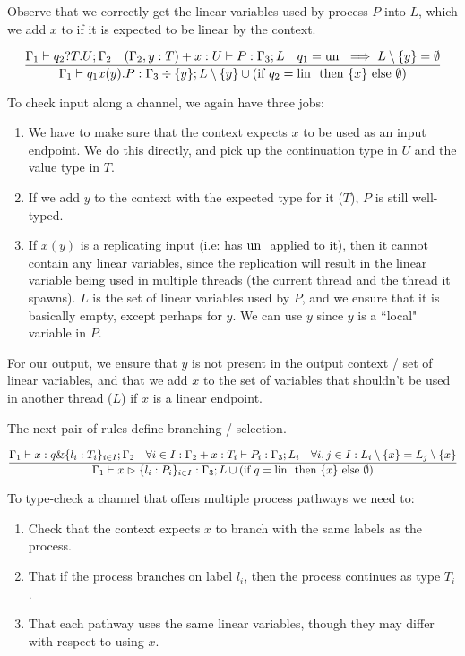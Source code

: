 Observe that we correctly get the linear variables used by process $P$ into $L$, which we add $x$ to if it is expected to be linear by the context.

$$
\frac{\Gamma_1 \vdash q_2?T.U ; \Gamma_2 \quad (\Gamma_2, y : T) + x : U \vdash P : \Gamma_3 ; L \quad q_1 = \text{un } \implies L \setminus \{y\} = \emptyset}{\Gamma_1 \vdash q_1 x(y) . P : \Gamma_3 \div \{y\} ; L \setminus \{y\} \cup  (\text{if } q_2 = \text{lin } \text{ then } \{x\} \text{ else } \emptyset)}
$$

To check input along a channel, we again have three jobs:
\begin{enumerate}
    \item We have to make sure that the context expects $x$ to be used as an input endpoint. We do this directly, and pick up the continuation type in $U$ and the value type in $T$.
    \item If we add $y$ to the context with the expected type for it ($T$), $P$ is still well-typed. 
    \item If $x(y)$ is a replicating input (i.e: has $\text{un }$ applied to it), then it cannot contain any linear variables, since the replication will result in the linear variable being used in multiple threads (the current thread and the thread it spawns). $L$ is the set of linear variables used by $P$, and we ensure that it is basically empty, except perhaps for $y$. We can use $y$ since $y$ is a ``local" variable in $P$.
\end{enumerate}

For our output, we ensure that $y$ is not present in the output context / set of linear variables, and that we add $x$ to the set of variables that shouldn't be used in another thread ($L$) if $x$ is a linear endpoint.


The next pair of rules define branching / selection.

$$
\frac{\Gamma_1 \vdash x : q \& \{l_i : T_i\}_{i \in I} ; \Gamma_2 \quad \forall{i \in I}:\Gamma_2 + x : T_i \vdash P_i : \Gamma_3 ; L_i \quad \forall{i,j \in I} : L_i \setminus \{x\} = L_j \setminus \{x\}}{\Gamma_1 \vdash x \vartriangleright \{l_i : P_i\}_{i \in I} : \Gamma_3 ; L \cup (\text{if } q = \text{lin } \text{ then } \{x\} \text{ else } \emptyset)} \\
$$

To type-check a channel that offers multiple process pathways we need to:
\begin{enumerate}
    \item Check that the context expects $x$ to branch with the same labels as the process.
    \item That if the process branches on label $l_i$, then the process continues as type $T_i$.
    \item That each pathway uses the same linear variables, though they may differ with respect to using $x$. 
\end{enumerate}

